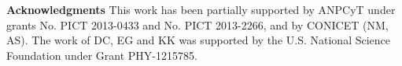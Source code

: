 \documentclass[aps,preprint,tightenlines,floatfix,superscriptaddress,nofootinbib,showpacs]{revtex4-1}
\begin{document}
\bigskip
\noindent
{\bf Acknowledgments}
\noindent 
This work has been partially supported by ANPCyT under grants No. PICT
2013-0433 and No. PICT 2013-2266, and by CONICET (NM, AS). The work of
DC, EG and KK was supported by the U.S.  National Science Foundation under Grant
PHY-1215785.
\section*{\refname}
\let\bibsection\relax

\setlength{\bibsep}{10pt}


\end{document}
